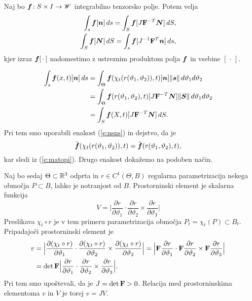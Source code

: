 \begin{izrek} \label{i:suittra}
	Naj bo $\boldsymbol f\colon S\times I\to\mathscr W$ integrabilno tenzorsko polje. Potem velja
	\begin{align*}
		\int_s\boldsymbol f[\boldsymbol n]\,ds=\int_S\boldsymbol f[J\mathbf F^{-T}\boldsymbol N]\,dS ,\\
		\int_S\boldsymbol f[\boldsymbol N]\,dS=\int_s\boldsymbol f[J^{-1}\mathbf F^{T}\boldsymbol n]\,ds,
	\end{align*}
	kjer izraz $\boldsymbol f[\,\cdot\,]$ nadomestimo z ustreznim produktom
	polja $\boldsymbol f$ in vsebine $[\,\cdot\,]$.
\end{izrek}

\proof
	\begin{align*}
		\int_s\boldsymbol f(x,t)[\boldsymbol n]\,ds&=
		\int_{\Theta}\boldsymbol f(\chi_t(r(\vartheta_1,\vartheta_2)),t)
		[\boldsymbol n]\|\boldsymbol s\|\,d\vartheta_1d\vartheta_2\\
		&=\int_{\Theta}\boldsymbol f(r(\vartheta_1,\vartheta_2),t)
		[J\mathbf F^{-T}\boldsymbol N]\|\boldsymbol S\|\,d\vartheta_1d\vartheta_2\\
		&=\int_S\boldsymbol f(X,t)[J\mathbf F^{-T}\boldsymbol N]\,dS.
	\end{align*}
	Pri tem smo uporabili enakost (\ref{e:nsns}) in dejstvo, da je
	\[ \bar{\boldsymbol f}(\chi_t(r(\vartheta_1,\vartheta_2)),t)=\hat{\boldsymbol f}(r(\vartheta_1,\vartheta_2),t), \]
	kar sledi iz (\ref{e:matopi}). Drugo enakost dokažemo na podoben način.
\endproof

Naj bo sedaj $\Theta\subset\mathbb R^3$ odprta in $r\in C^1(\Theta,B)$ regularna parametrizacija
nekega območja $P\subset B$, lahko je notranjost od $B$. Prostorninski element je
skalarna funkcija
\[
	V=\Big|\frac{\partial r}{\partial\vartheta_1}\cdot
	\frac{\partial r}{\partial\vartheta_2}\times\frac{\partial r}{\partial\vartheta_3}\Big|
\]
Preslikava $\chi_t\circ r$ je v tem primeru parametrizacija območja $P_t=\chi_t(P)\subset B_t$.
Pripadajoči prostorninski element je
\begin{align*}
	v&=\Big|\frac{\partial(\chi_t\circ r)}{\partial\vartheta_1}\cdot
	\frac{\partial(\chi_t\circ r)}{\partial\vartheta_2}\times\frac{\partial(\chi_t\circ r)}{\partial\vartheta_3}\Big|
	=\Big|\mathbf F\frac{\partial r}{\partial\vartheta_1}\cdot
	\mathbf F\frac{\partial r}{\partial\vartheta_2}\times\mathbf F\frac{\partial r}{\partial\vartheta_3}\Big| \\
	&=\det\mathbf F\Big|\frac{\partial r}{\partial\vartheta_1}\cdot
	\frac{\partial r}{\partial\vartheta_2}\times\frac{\partial r}{\partial\vartheta_3}\Big|.
\end{align*}
Pri tem smo upoštevali, da je $J=\det\mathbf F>0$.
Relacija med prostorninskima elementoma $v$ in $V$ je torej $v=JV$.


